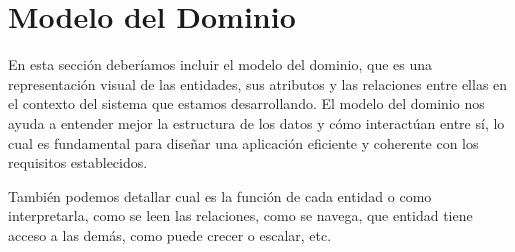 \section{Modelo del Dominio}
En esta sección deberíamos incluir el modelo del dominio, que es una representación visual de las 
entidades, sus atributos y las relaciones entre ellas en el contexto del sistema que estamos desarrollando. 
El modelo del dominio nos ayuda a entender mejor la estructura de los datos y cómo interactúan entre sí, 
lo cual es fundamental para diseñar una aplicación eficiente y coherente con los requisitos establecidos.
\par
También podemos detallar cual es la función de cada entidad o como interpretarla, como se leen las relaciones, 
como se navega, que entidad tiene acceso a las demás, como puede crecer o escalar, etc.

